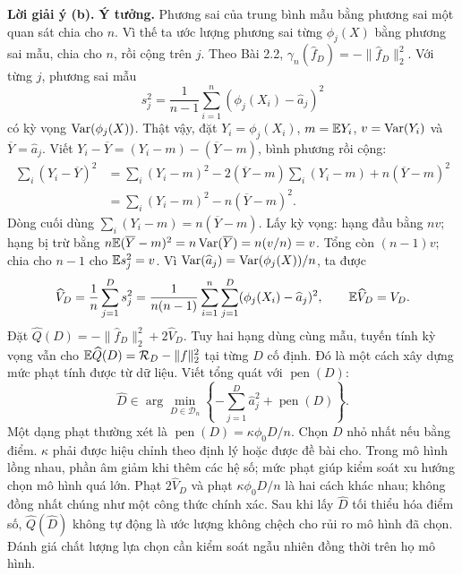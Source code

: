 \textbf{Lời giải ý (b).}
\textbf{Ý tưởng.} Phương sai của trung bình mẫu bằng phương sai một quan sát
chia cho $n$. Vì thế ta ước lượng phương sai từng $\phi_j(X)$ bằng phương sai mẫu,
chia cho $n$, rồi cộng trên $j$.
Theo Bài 2.2, $\gamma_n(\widehat f_D)=-\|\widehat f_D\|_2^2$.
Với từng $j$, phương sai mẫu
\[
s_j^2=\frac1{n-1}\sum_{i=1}^n(\phi_j(X_i)-\widehat a_j)^2
\]
có kỳ vọng $\operatorname{Var}(\phi_j(X))$. Thật vậy,
đặt $Y_i=\phi_j(X_i)$, $m=\mathbb E Y_i$, $v=\operatorname{Var}(Y_i)$ và $\overline Y=\widehat a_j$.
Viết $Y_i-\overline Y=(Y_i-m)-(\overline Y-m)$, bình phương rồi cộng:
\begin{align*}
\sum_i(Y_i-\overline Y)^2
&=\sum_i(Y_i-m)^2
-2(\overline Y-m)\sum_i(Y_i-m)+n(\overline Y-m)^2\\
&=\sum_i(Y_i-m)^2-n(\overline Y-m)^2.
\end{align*}
Dòng cuối dùng $\sum_i(Y_i-m)=n(\overline Y-m)$.
Lấy kỳ vọng: hạng đầu bằng $nv$; hạng bị trừ bằng
$n\mathbb E(\overline Y-m)^2=n\operatorname{Var}(\overline Y)=n(v/n)=v$.
Tổng còn $(n-1)v$; chia cho $n-1$ cho $\mathbb E s_j^2=v$.
Vì $\operatorname{Var}(\widehat a_j)=\operatorname{Var}(\phi_j(X))/n$, ta được
\[
\widehat V_D=\frac1n\sum_{j=1}^Ds_j^2
=\frac1{n(n-1)}\sum_{i=1}^n\sum_{j=1}^D(\phi_j(X_i)-\widehat a_j)^2,
\qquad\mathbb E\widehat V_D=V_D.
\]
Đặt $\widehat Q(D)=-\|\widehat f_D\|_2^2+2\widehat V_D$. Tuy hai hạng dùng cùng mẫu,
tuyến tính kỳ vọng vẫn cho $\mathbb E\widehat Q(D)=\mathcal R_D-\|f\|_2^2$ tại từng $D$ cố định.
Đó là một cách xây dựng mức phạt tính được từ dữ liệu.
Viết tổng quát với $\operatorname{pen}(D)$:
\[
\boxed{\widehat D\in\arg\min_{D\in\mathcal D_n}
\left\{-\sum_{j=1}^D\widehat a_j^2+\operatorname{pen}(D)\right\}.}
\]
Một dạng phạt thường xét là $\operatorname{pen}(D)=\kappa\phi_0D/n$.
Chọn $D$ nhỏ nhất nếu bằng điểm. $\kappa$ phải được hiệu chỉnh theo định lý hoặc được đề bài cho.
Trong mô hình lồng nhau, phần âm giảm khi thêm các hệ số;
mức phạt giúp kiểm soát xu hướng chọn mô hình quá lớn.
Phạt $2\widehat V_D$ và phạt $\kappa\phi_0D/n$ là hai cách khác nhau;
không đồng nhất chúng như một công thức chính xác.
Sau khi lấy $\widehat D$ tối thiểu hóa điểm số,
$\widehat Q(\widehat D)$ không tự động là ước lượng không chệch cho rủi ro mô hình đã chọn.
Đánh giá chất lượng lựa chọn cần kiểm soát ngẫu nhiên đồng thời trên họ mô hình.

